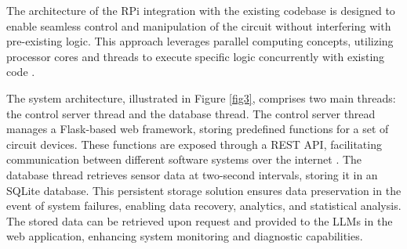 \documentclass[lettersize,journal]{IEEEtran}
\begin{document}

The architecture of the RPi integration with the existing codebase is designed to enable seamless control and manipulation of the circuit without interfering with pre-existing logic. This approach leverages parallel computing concepts, utilizing processor cores and threads to execute specific logic concurrently with existing code \cite{wilkinson2005parallel}.

The system architecture, illustrated in Figure  \ref{fig3}, comprises two main threads: the control server thread and the database thread. The control server thread manages a Flask-based web framework, storing predefined functions for a set of circuit devices. These functions are exposed through a REST API, facilitating communication between different software systems over the internet \cite{Surwase2016RESTAM}. The database thread retrieves sensor data at two-second intervals, storing it in an SQLite database. This persistent storage solution ensures data preservation in the event of system failures, enabling data recovery, analytics, and statistical analysis. The stored data can be retrieved upon request and provided to the LLMs in the web application, enhancing system monitoring and diagnostic capabilities.
\end{document}
